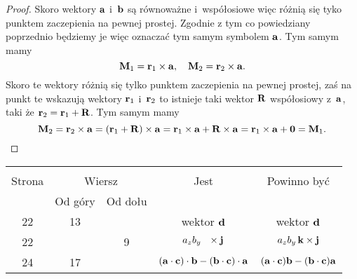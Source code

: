 \documentclass[a4paper,11pt]{article}
\begin{document}
\begin{proof}

  Skoro wektory
  $\mathbf{a}$ i~$\mathbf{b}$ są równoważne i~współosiowe więc różnią się tyko
  punktem zaczepienia na pewnej prostej. Zgodnie z tym co powiedziany
  poprzednio będziemy je więc oznaczać tym samym symbolem $\mathbf{a}$. Tym
  samym mamy
  \begin{equation}
    \label{eq:SkalmierskiMechanika-07}
    \mathbf{M}_{ 1 } = \mathbf{r}_{ 1 } \times \mathbf{a}, \quad
    \mathbf{M}_{ 2 } = \mathbf{r}_{ 2 } \times \mathbf{a}.
  \end{equation}
  Skoro te wektory różnią się tylko punktem zaczepienia na pewnej prostej,
  zaś na punkt te wskazują wektory $\mathbf{r}_{ 1 }$ i~$\mathbf{r}_{ 2 }$ to
  istnieje taki wektor $\mathbf{R}$ współosiowy z~$\mathbf{a}$, taki że
  $\mathbf{r}_{ 2 } = \mathbf{r}_{ 1 } + \mathbf{R}$. Tym samym mamy
  \begin{equation}
    \label{eq:SkalmierskiMechanika-08}
    \mathbf{M}_{ 2 } =
    \mathbf{r}_{ 2 } \times \mathbf{a} =
    ( \mathbf{r}_{ 1 } + \mathbf{R} ) \times \mathbf{a} =
    \mathbf{r}_{ 1 } \times \mathbf{a} + \mathbf{R} \times \mathbf{a} =
    \mathbf{r}_{ 1 } \times \mathbf{a} + \mathbf{0} = \mathbf{M}_{ 1 }.
  \end{equation}

\end{proof}











\begin{center}

  \begin{tabular}{|c|c|c|c|c|}
    \hline
    & \multicolumn{2}{c|}{} & & \\
    Strona & \multicolumn{2}{c|}{Wiersz} & Jest
                              & Powinno być \\ \cline{2-3}
    & Od góry & Od dołu & & \\
    \hline
    22 & 13 & & wektor{ }{ }{ }$\mathbf{d}$ & wektor $\mathbf{d}$ \\
    22 & &  9 & $a_{ z } b_{ y } \, \hphantom{k} \times \mathbf{j}$
           & $a_{ z } b_{ y } \, \mathbf{k} \times \mathbf{j}$ \\
    24 & 17 & &  $( \mathbf{a} \cdot \mathbf{c} ) \cdot \mathbf{b}
                - ( \mathbf{b} \cdot \mathbf{c} ) \cdot \mathbf{a}$
           & $( \mathbf{a} \cdot \mathbf{c} ) \mathbf{b}
             - ( \mathbf{b} \cdot \mathbf{c} ) \mathbf{a}$ \\
    \hline
  \end{tabular}

\end{center}
\end{document}
